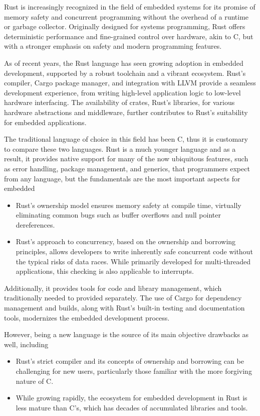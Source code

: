 
Rust is increasingly recognized in the field of embedded systems for its promise of memory safety and concurrent programming without the overhead of a runtime or garbage collector. Originally designed for systems programming, Rust offers deterministic performance and fine-grained control over hardware, akin to C, but with a stronger emphasis on safety and modern programming features.

As of recent years, the Rust language has seen growing adoption in embedded development, supported by a robust toolchain and a vibrant ecosystem. Rust's compiler, Cargo package manager, and integration with LLVM provide a seamless development experience, from writing high-level application logic to low-level hardware interfacing. The availability of crates, Rust's libraries, for various hardware abstractions and middleware, further contributes to Rust's suitability for embedded applications.

The traditional language of choice in this field has been C, thus it is customary to compare these two languages. Rust is a much younger language and as a result, it provides native support for many of the now ubiquitous features, such as error handling, package management, and generics, that programmers expect from any language, but the fundamentals are the most important aspects for embedded
\begin{itemize}
    \item Rust's ownership model ensures memory safety at compile time, virtually eliminating common bugs such as buffer overflows and null pointer dereferences.
    \item Rust's approach to concurrency, based on the ownership and borrowing principles, allows developers to write inherently safe concurrent code without the typical risks of data races. While primarily developed for multi-threaded applications, this checking is also applicable to interrupts.
\end{itemize}

Additionally, it provides tools for code and library management, which traditionally needed to provided separately. The use of Cargo for dependency management and builds, along with Rust's built-in testing and documentation tools, modernizes the embedded development process.

However, being a new language is the source of its main objective drawbacks as well, including
\begin{itemize}
    \item Rust's strict compiler and its concepts of ownership and borrowing can be challenging for new users, particularly those familiar with the more forgiving nature of C.
    \item While growing rapidly, the ecosystem for embedded development in Rust is less mature than C's, which has decades of accumulated libraries and tools.
\end{itemize}

